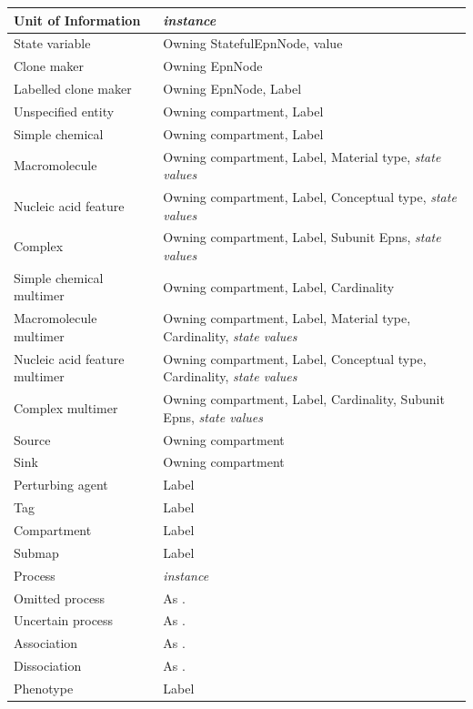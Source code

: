 \begin{center}
\begin{small}
\begin{supertabular}{|p{4.5cm}|p{10cm}|}\hline
Unit of Information & \emph{instance} \\\hline
State variable & Owning StatefulEpnNode, value \\\hline
Clone maker & Owning EpnNode \\\hline
Labelled clone maker & Owning EpnNode, Label \\\hline
Unspecified entity & Owning compartment, Label \\\hline
Simple chemical & Owning compartment, Label \\\hline
Macromolecule & Owning compartment, Label, Material type, \emph{state values} \\\hline
Nucleic acid feature & Owning compartment, Label, Conceptual type, \emph{state values} \\\hline
Complex & Owning compartment, Label, Subunit Epns, \emph{state values} \\\hline
Simple chemical multimer & Owning compartment, Label, Cardinality \\\hline
Macromolecule multimer & Owning compartment, Label, Material type, Cardinality, \emph{state values} \\\hline
Nucleic acid feature multimer & Owning compartment, Label, Conceptual type, Cardinality, \emph{state values} \\\hline
Complex multimer & Owning compartment, Label, Cardinality, Subunit Epns, \emph{state values} \\\hline
Source & Owning compartment \\\hline
Sink & Owning compartment \\\hline
Perturbing agent & Label \\\hline
Tag & Label \\\hline
Compartment & Label \\\hline
Submap & Label \\\hline
Process & \emph{instance} \\\hline
Omitted process & As . \\\hline
Uncertain process & As . \\\hline
Association & As . \\\hline
Dissociation & As . \\\hline
Phenotype & Label \\\hline
\end{supertabular}
\end{small}
\end{center}

